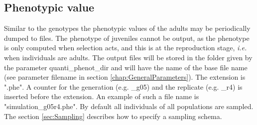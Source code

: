 \documentclass[letterpaper,12pt,oneside]{book}
\begin{document}
\subsection{Phenotypic value}\label{phenoQuanti}
Similar to the genotypes the phenotypic values of the adults may be periodically dumped to files. The phenotype of juveniles cannot be output, as the phenotype is only computed when selection acts, and this is at the reproduction stage, \textit{i.e.} when individuals are adults. The output files will be stored in the folder given by the parameter \textsf{quanti\_phenot\_dir} and will have the name of the base file name (see parameter \textsf{filename} in section \ref{chap:GeneralParameters}). The extension is ".phe". A counter for the generation (e.g. \_g05) and the replicate (e.g. \_r4) is inserted before the extension. An example of such a file name is \textsf{"simulation\_g05r4.phe"}. By default all individuals of all populations are sampled. The section \ref{sec:Sampling} describes how to specify a sampling schema.
\end{document}
